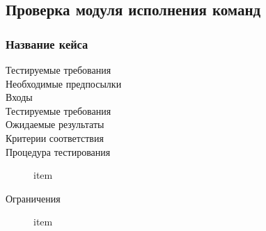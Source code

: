 \documentclass[a4paper, 12pt]{article}
\begin{document}
\subsection{Проверка модуля исполнения команд} %
\subsubsection{Название кейса} %


\begin{description}
	\item[Тестируемые требования] 
	\item[Необходимые предпосылки] 
	\item[Входы] %
	\item[Тестируемые требования] 
	\item[Ожидаемые результаты]
	\item[Критерии соответствия]
	\item[Процедура тестирования] item
	\item[Ограничения] item
\end{description}


\end{document}
